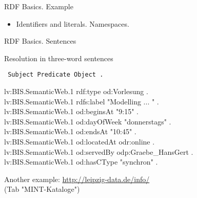 \documentclass{beamer}
\def\lt{\texttt{<}}
\def\gt{\texttt{>}}
\begin{document}
\begin{frame}{RDF Basics. Example}

  {\small\tt {}}
  
  \begin{itemize}
  \item Identifiers and literals. Namespaces.
  \end{itemize}
\end{frame}
\begin{frame}{RDF Basics. Sentences}

Resolution in three-word sentences
\begin{center}\tt
  Subject Predicate Object .
\end{center}

  {\small\tt \begin{tabbing}
    lv:BIS.SemanticWeb.1 rdf:type od:Vorlesung .\\
    lv:BIS.SemanticWeb.1 rdfs:label	"Modelling ... " .\\
    lv:BIS.SemanticWeb.1 od:beginsAt	"9:15" .\\
    lv:BIS.SemanticWeb.1 od:dayOfWeek	"donnerstags" .\\
    lv:BIS.SemanticWeb.1 od:endsAt	"10:45" .\\
    lv:BIS.SemanticWeb.1 od:locatedAt	odr:online .\\
    lv:BIS.SemanticWeb.1 od:servedBy	odp:Graebe\_HansGert .\\
    lv:BIS.SemanticWeb.1 od:hasCType	"synchron" .
  \end{tabbing}}

  Another example:
  \url{http://leipzig-data.de/info/}\\ (Tab "MINT-Kataloge") 
\end{frame}
\end{document}
